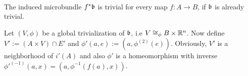  \\
The induced microbundle $f^*\mathfrak{b}$ is trivial for every map $f: A \to B$, if $\mathfrak{b}$ is already trivial.
\begin{myproof}
Let $(V, \phi)$ be a global trivialization of $\mathfrak{b}$, i.e $V \cong_\phi B \times \mathbb{R}^n$.
Now define $V' := (A \times V) \cap E'$ and $\phi'(a, e) := (a, \phi^{(2)}(e))$.
Obviously, $V'$ is a neighborhood of $i'(A)$ and also $\phi'$ is a homeomorphism with inverse $\phi'^{(-1)}(a, x) = (a, \phi^{-1}(f(a), x))$.
\end{myproof}